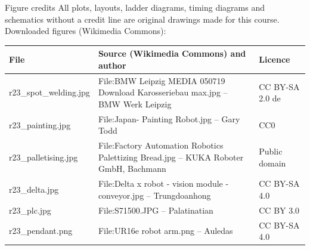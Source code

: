 \documentclass[aspectratio=169,10pt]{beamer}
\begin{document}
\begin{frame}[t]{Figure credits}
\scriptsize
All plots, layouts, ladder diagrams, timing diagrams and schematics without a credit line are original drawings made for this course.
Downloaded figures (Wikimedia Commons):\\[2mm]
\begin{tabularx}{\linewidth}{@{}l X l@{}}
\toprule
\textbf{File} & \textbf{Source (Wikimedia Commons) and author} & \textbf{Licence}\\
\midrule
r23\_spot\_welding.jpg & File:BMW Leipzig MEDIA 050719 Download Karosseriebau max.jpg -- BMW Werk Leipzig & CC BY-SA 2.0 de\\
r23\_painting.jpg & File:Japan- Painting Robot.jpg -- Gary Todd & CC0\\
r23\_palletising.jpg & File:Factory Automation Robotics Palettizing Bread.jpg -- KUKA Roboter GmbH, Bachmann & Public domain\\
r23\_delta.jpg & File:Delta x robot - vision module - conveyor.jpg -- Trungdoanhong & CC BY-SA 4.0\\
r23\_plc.jpg & File:S71500.JPG -- Palatinatian & CC BY 3.0\\
r23\_pendant.png & File:UR16e robot arm.png -- Auledas & CC BY-SA 4.0\\
\bottomrule
\end{tabularx}
\end{frame}
\end{document}

